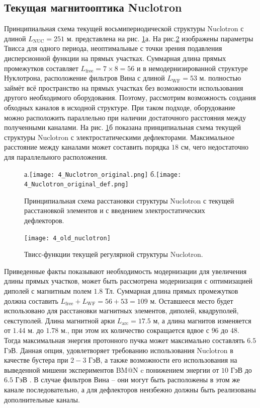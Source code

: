 	\subsection{Текущая магнитооптика Nuclotron}\label{sec:EDM/optics}
\par Принципиальная схема текущей восьмипериодической структуры Nuclotron с длиной $L_{\text{NUC}}=251$ м. представлена на рис. \ref{fig:4_Nuclotron_original}а. На рис.\ref{fig:4_old_nuclotron} изображены параметры Твисса для одного периода, неоптимальные с точки зрения подавления дисперсионной функции на прямых участках. Суммарная длина прямых промежутков составляет $L_{\text{free}} = 7\times8=56$ и в немодернизированной структуре Нуклотрона, расположение фильтров Вина с длиной $L_{\text{WF}} = 53$ м. полностью займёт всё пространство на прямых участках без возможности использования другого необходимого оборудования. Поэтому, рассмотрим возможность создания обходных каналов в исходной структуре. При таком подходе, оборудование можно расположить параллельно при наличии достаточного расстояния между полученными каналами. На рис. \ref{fig:4_Nuclotron_original}б показана принципиальная схема текущей структуры Nuclotron с электростатическими дефлекторами. Максимальное расстояние между каналами может составить порядка $18$ см, чего недостаточно для параллельного расположения.

\begin{figure}[!h]
	\centering
	а.\texttt{[image: 4\_Nuclotron\_original.png]}
	б.\texttt{[image: 4\_Nuclotron\_original\_def.png]}
	\caption{Принципиальная схема расстановки структуры Nuclotron с текущей расстановкой элементов и с введением электростатических дефлекторов.}
	\label{fig:4_Nuclotron_original}
\end{figure}

\begin{figure}[!h]
  \centering
	\texttt{[image: 4\_old\_nuclotron]}
   \caption{Твисс-функции текущей регулярной структуры Nuclotron.}
   \label{fig:4_old_nuclotron}
\end{figure}

\par Приведенные факты показывают необходимость модернизации для увеличения длины прямых участков, может быть рассмотрена модернизация с оптимизацией диполей с магнитным полем $1.8$ Тл. Суммарная длина прямых промежутков должна составить $L_{\text{free}}+L_{\text{WF}}=56+53 = 109$ м. Оставшееся место будет использовано для расстановки магнитных элементов, диполей, квадруполей, секступолей. Длина магнитной арки $L_{\textrm{arc}}=17.5$ м, а длина магнитов изменяется от $1.44$ м. до $1.78$ м., при этом их количество сокращается вдвое с $96$ до $48$. Тогда максимальная энергия протонного пучка может максимально составлять $6.5$ ГэВ. Данная опция, удовлетворяет требованию использования Nuclotron в качестве бустера при $2-3$ ГэВ, а также возможности его использования на выведенной мишени экспериментов BM@N c понижением энергии от $10$ ГэВ до $6.5$ ГэВ \cite{kovalenko:nuclotron}. В случае фильтров Вина – они могут быть расположены в этом же канале последовательно, а для дефлекторов неизбежно должны быть реализованы дополнительные каналы.

